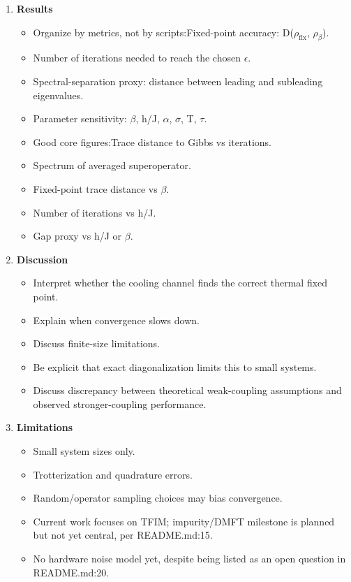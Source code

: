 \documentclass[11pt,a4paper]{article}
\begin{document}
\begin{itemize}
\begin{enumerate}
    \item \textbf{Results}
    \begin{itemize}
      \item Organize by metrics, not by scripts:Fixed-point accuracy: D($\rho_\text{fix}$, $\rho_\beta$).
      \item Number of iterations needed to reach the chosen $\epsilon$.
      \item Spectral-separation proxy: distance between leading and subleading eigenvalues.
      \item Parameter sensitivity: $\beta$, h/J, $\alpha$, $\sigma$, T, $\tau$.
      \item Good core figures:Trace distance to Gibbs vs iterations.
      \item Spectrum of averaged superoperator.
      \item Fixed-point trace distance vs $\beta$.
      \item Number of iterations vs h/J.
      \item Gap proxy vs h/J or $\beta$.
    \end{itemize}

    \item \textbf{Discussion}
    \begin{itemize}
      \item Interpret whether the cooling channel finds the correct thermal fixed point.
      \item Explain when convergence slows down.
      \item Discuss finite-size limitations.
      \item Be explicit that exact diagonalization limits this to small systems.
      \item Discuss discrepancy between theoretical weak-coupling assumptions and observed stronger-coupling performance.
    \end{itemize}

    \item \textbf{Limitations}
    \begin{itemize}
      \item Small system sizes only.
      \item Trotterization and quadrature errors.
      \item Random/operator sampling choices may bias convergence.
      \item Current work focuses on TFIM; impurity/DMFT milestone is planned but not yet central, per README.md:15.
      \item No hardware noise model yet, despite being listed as an open question in README.md:20.
    \end{itemize}


\end{enumerate}
\end{itemize}
\end{document}
